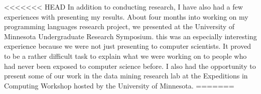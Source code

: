 \documentclass[a4paper,12pt]{article}
\newcommand{\tab}{\hspace*{2em}}
\begin{document}
<<<<<<< HEAD
In addition to conducting research, I have also had a few experiences with presenting my results.  About four months into working on my programming languages research project, we presented at the University of Minnesota Undergraduate Research Symposium.  this was an especially interesting experience because we were not just presenting to computer scientists.  It proved to be a rather difficult task to explain what we were working on to people who had never been exposed to computer science before. I also had the opportunity to present some of our work in the data mining research lab at the Expeditions in Computing Workshop hosted by the University of Minnesota. 
=======



\end{document}
